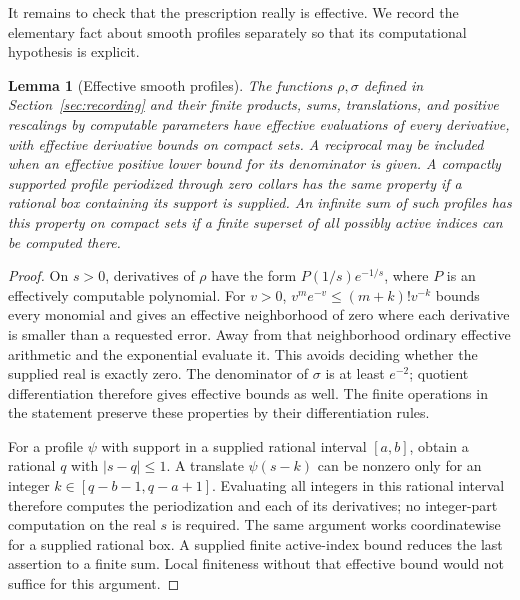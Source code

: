 \documentclass[11pt]{article}
\newtheorem{lemma}{Lemma}
\begin{document}


It remains to check that the prescription really is effective. We
record the elementary fact about smooth profiles separately so that
its computational hypothesis is explicit.

\begin{lemma}[Effective smooth profiles]\label{lem:profiles}
The functions $\rho,\sigma$ defined in Section~\ref{sec:recording}
and their finite products, sums, translations, and positive rescalings
by computable parameters have effective evaluations of every derivative,
with effective derivative bounds on compact sets. A reciprocal may be
included when an effective positive lower bound for its denominator is
given. A compactly supported profile periodized through zero collars
has the same property if a rational box containing its support is
supplied. An infinite sum of such profiles has this
property on compact sets if a finite superset of all possibly active
indices can be computed there.
\end{lemma}
\begin{proof}
On $s>0$, derivatives of $\rho$ have the form $P(1/s)e^{-1/s}$,
where $P$ is an effectively computable polynomial. For $v>0$,
$v^m e^{-v}\leq(m+k)!v^{-k}$ bounds every monomial and gives an
effective neighborhood of zero where each derivative is smaller than
a requested error. Away from that neighborhood ordinary effective
arithmetic and the exponential evaluate it. This avoids deciding
whether the supplied real is exactly zero. The denominator of
$\sigma$ is at least $e^{-2}$; quotient differentiation therefore
gives effective bounds as well. The finite operations in the statement
preserve these properties by their differentiation rules.

For a profile $\psi$ with support in a supplied rational interval
$[a,b]$, obtain a rational $q$ with $|s-q|\leq1$. A translate
$\psi(s-k)$ can be nonzero only for an integer
$k\in[q-b-1,q-a+1]$. Evaluating all integers in this rational interval
therefore computes the periodization and each of its derivatives;
no integer-part computation on the real $s$ is required. The same
argument works coordinatewise for a supplied rational box.
A supplied finite active-index
bound reduces the last assertion to a finite sum. Local finiteness
without that effective bound would not suffice for this argument.
\end{proof}
\end{document}
